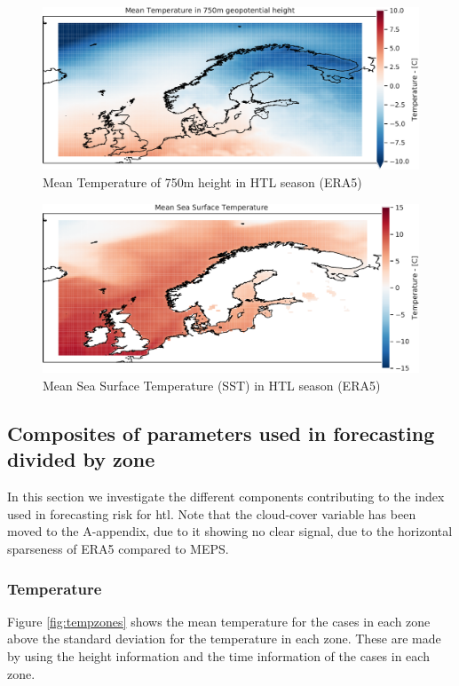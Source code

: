 \begin{figure}
    \centering
    \includegraphics[width=\textwidth]{Figures/MeanT750era5.pdf}
    \caption{Mean Temperature of 750m height in HTL season (ERA5)}
    \label{fig:meaneraT750}
\end{figure}

\begin{figure}
    \centering
    \includegraphics[width=\textwidth]{Figures/MeanSSTera5.pdf}
    \caption{Mean Sea Surface Temperature (SST) in HTL season (ERA5)}
    \label{fig:meanerasst}
\end{figure}

\subsection{Composites of parameters used in forecasting divided by zone}
In this section we investigate the different components contributing to the index used in forecasting risk for \acrlong{htl}. Note that the cloud-cover variable has been moved to the A-appendix, due to it showing no clear signal, due to the horizontal sparseness of ERA5 compared to MEPS.

\subsubsection{Temperature}
Figure \ref{fig:tempzones} shows the mean temperature for the cases in each zone above the standard deviation for the temperature in each zone. These are made by using the height information and the time information of the cases in each zone. 

